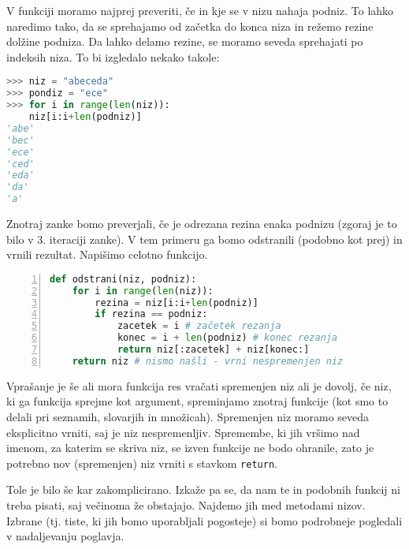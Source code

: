 \begin{resitev}
V funkciji moramo najprej preveriti, če in kje se v nizu nahaja podniz. To lahko naredimo tako, da se sprehajamo od začetka do konca niza in režemo rezine dolžine podniza. Da lahko delamo rezine, se moramo seveda sprehajati po indeksih niza. To bi izgledalo nekako takole:
\begin{lstlisting}[language=Python]
>>> niz = "abeceda"
>>> pondiz = "ece"
>>> for i in range(len(niz)):
	niz[i:i+len(podniz)]
'abe'
'bec'
'ece'
'ced'
'eda'
'da'
'a'
\end{lstlisting}
Znotraj zanke bomo preverjali, če je odrezana rezina enaka podnizu (zgoraj je to bilo v 3. iteraciji zanke). V tem primeru ga bomo odstranili (podobno kot prej) in vrnili rezultat. Napišimo celotno funkcijo.
\begin{lstlisting}[language=Python,numbers=left]
def odstrani(niz, podniz):
    for i in range(len(niz)):
        rezina = niz[i:i+len(podniz)]
        if rezina == podniz:
            zacetek = i # začetek rezanja
            konec = i + len(podniz) # konec rezanja
            return niz[:zacetek] + niz[konec:]
    return niz # nismo našli - vrni nespremenjen niz
\end{lstlisting}
Vprašanje je še ali mora funkcija res vračati spremenjen niz ali je dovolj, če niz, ki ga funkcija sprejme kot argument, spreminjamo znotraj funkcije (kot smo to delali pri seznamih, slovarjih in množicah). Spremenjen niz moramo seveda eksplicitno vrniti, saj je niz nespremenljiv. Spremembe, ki jih vršimo nad imenom, za katerim se skriva niz, se izven funkcije ne bodo ohranile, zato je potrebno nov (spremenjen) niz vrniti s stavkom \texttt{return}. 
\end{resitev}

Tole je bilo še kar zakomplicirano. Izkaže pa se, da nam te in podobnih funkcij ni treba pisati, saj večinoma že obstajajo. Najdemo jih med metodami nizov. Izbrane (tj. tiste, ki jih bomo uporabljali pogosteje) si bomo podrobneje pogledali v nadaljevanju poglavja.

